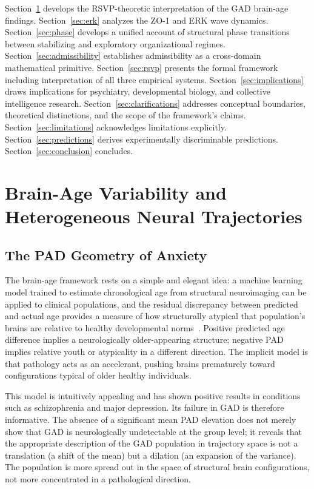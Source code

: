 \documentclass[11pt,a4paper]{article}
\theoremstyle{plain}
\theoremstyle{definition}
\begin{document}
Section~\ref{sec:gad} develops the RSVP-theoretic interpretation of the GAD brain-age
findings. Section~\ref{sec:erk} analyzes the ZO-1 and ERK wave dynamics.
Section~\ref{sec:phase} develops a unified account of structural phase transitions between
stabilizing and exploratory organizational regimes. Section~\ref{sec:admissibility}
establishes admissibility as a cross-domain mathematical primitive. Section~\ref{sec:rsvp}
presents the formal framework including interpretation of all three empirical systems.
Section~\ref{sec:implications} draws implications for psychiatry, developmental biology,
and collective intelligence research. Section~\ref{sec:clarifications} addresses
conceptual boundaries, theoretical distinctions, and the scope of the framework's claims.
Section~\ref{sec:limitations} acknowledges limitations explicitly.
Section~\ref{sec:predictions} derives experimentally discriminable predictions.
Section~\ref{sec:conclusion} concludes.

\section{Brain-Age Variability and Heterogeneous Neural Trajectories}
\label{sec:gad}

\subsection{The PAD Geometry of Anxiety}

The brain-age framework rests on a simple and elegant idea: a machine learning model
trained to estimate chronological age from structural neuroimaging can be applied to
clinical populations, and the residual discrepancy between predicted and actual age
provides a measure of how structurally atypical that population's brains are relative
to healthy developmental norms~\cite{Richier2026}. Positive predicted age difference
implies a neurologically older-appearing structure; negative PAD implies relative youth
or atypicality in a different direction. The implicit model is that pathology acts as an
accelerant, pushing brains prematurely toward configurations typical of older healthy
individuals.

This model is intuitively appealing and has shown positive results in conditions such as
schizophrenia and major depression. Its failure in GAD is therefore informative. The
absence of a significant mean PAD elevation does not merely show that GAD is neurologically
undetectable at the group level; it reveals that the appropriate description of the
GAD population in trajectory space is not a translation (a shift of the mean) but a
dilation (an expansion of the variance). The population is more spread out in the
space of structural brain configurations, not more concentrated in a pathological direction.
\end{document}
